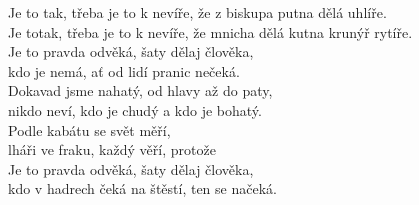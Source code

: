  
\nv{}Je to tak, třeba je to k nevíře, že z biskupa putna \mm{}dělá uhlíře.\nc{}\\
Je \sm {}\sm totak, třeba je to k nevíře, \sm{} že mnicha dělá kutna krunýř rytíře.
\vnv\\
\nv{}Je to pravda  odvěká, šaty dělaj člověka,\\
kdo je nemá, ať od lidí pranic nečeká.\\
Dokavad jsme nahatý, od hlavy až do paty,\\
nikdo neví, kdo je chudý a kdo je bohatý.
\vnv\\
\nv{}Podle kabátu se \sm{}svět měří, \mm{}\\
lháři ve fraku, každý věří, protože\\
Je to pravda  odvěká, šaty dělaj člověka,\\
kdo v hadrech čeká na štěstí, ten se načeká.

\newpage